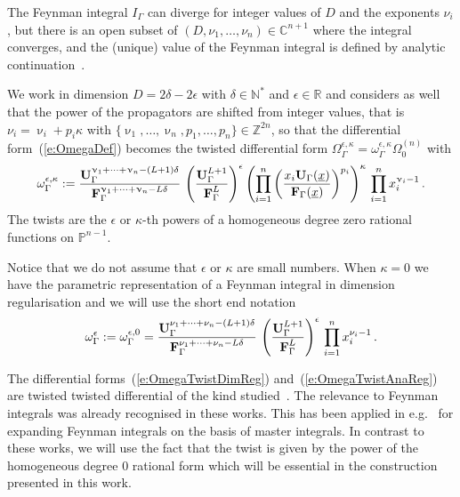 \documentclass[a4paper,12pt]{article}
\numberwithin{equation}{section}
\numberwithin{figure}{section}
\begin{document}
The Feynman integral $I_\Gamma$ can diverge  for integer values of $D$ and 
the exponents $\nu_i$, but there is an open subset of
$(D,\nu_1,\dots,\nu_n)\in\mathbb C^{n+1}$ where  the integral
converges,  and the (unique) value of the Feynman integral is  defined by analytic continuation~\cite{Speer}.


We work in dimension $D=2\delta-2\epsilon$ with $\delta\in\mathbb N^*$ and
$\epsilon\in\mathbb R$ and  considers as well that the power of the propagators are shifted from integer values, that is  $\nu_i=\upnu_i
+ p_i \kappa$ with $\{\upnu_1,\dots,\upnu_n,p_1,\dots,p_n\}\in\mathbb Z^{2n}$, so that the 
differential form~(\ref{e:OmegaDef}) becomes the twisted
differential form $\Omega^{\epsilon,\kappa}_\Gamma
=\omega^{\epsilon,\kappa}_\Gamma \Omega_0^{(n)}$ with
\begin{equation}\label{e:OmegaTwistAnaReg}
	\omega^{\epsilon,\kappa}_\Gamma := { \textbf{U}_\Gamma
		^{\upnu_1+\cdots+\upnu_n-(L+1)\delta}  \over \textbf{F}_\Gamma
		^{\upnu_1+\cdots+\upnu_n-L\delta}
	}\,\left(\textbf{U}_\Gamma^{L+1}\over \textbf{F}_\Gamma^L\right)^\epsilon
	\left(\prod_{i=1}^n \left(x_i \textbf{U}_\Gamma(\underline x)\over
	\textbf{F}_\Gamma(\underline x)\right)^{p_i}\right)^{\kappa} \, \prod_{i=1}^n x_i^{\upnu_i-1} \,.
\end{equation}
%
The twists are the $\epsilon$ or $\kappa$-th powers of a homogeneous
degree zero rational functions on $\mathbb
P^{n-1}$.


Notice that we do not assume that $\epsilon$ or $\kappa$ are small numbers.
When $\kappa=0$ we have the parametric representation of a Feynman
integral in dimension regularisation and we will use the short end
notation 
\begin{equation}\label{e:OmegaTwistDimReg}
\omega^\epsilon_\Gamma:=\omega^{\epsilon,0}_\Gamma = { \textbf{U}_\Gamma ^{\nu_1+\cdots+\nu_n-(L+1)\delta}  \over \textbf{F}_\Gamma ^{\nu_1+\cdots+\nu_n-L\delta} }\,
	\left(\textbf{U}_\Gamma^{L+1}\over \textbf{F}_\Gamma^{L}\right)^{\epsilon} \, \prod_{i=1}^n x_i^{\nu_i-1} \, .
\end{equation}
%

\medskip

The differential forms~(\ref{e:OmegaTwistDimReg})
and~(\ref{e:OmegaTwistAnaReg}) are twisted
twisted differential of the kind
studied~\cite{Aomoto1,Aomoto,Aomoto_1982,AomotoBook}.
The
relevance to Feynman integrals was already recognised in these works. 
This has been applied in
e.g.~\cite{Mizera:2017rqa,Frellesvig:2019uqt,Cacciatori:2021nli,Munch:2023ifm,Brunello:2023rpq,Teschke:2024bct}  for
expanding Feynman integrals on the basis of master integrals. In contrast to these works, 
%
we will use
the fact that the twist is given by
the power of the homogeneous degree 0 rational form
which will be essential
in the construction presented in this work.
\end{document}
